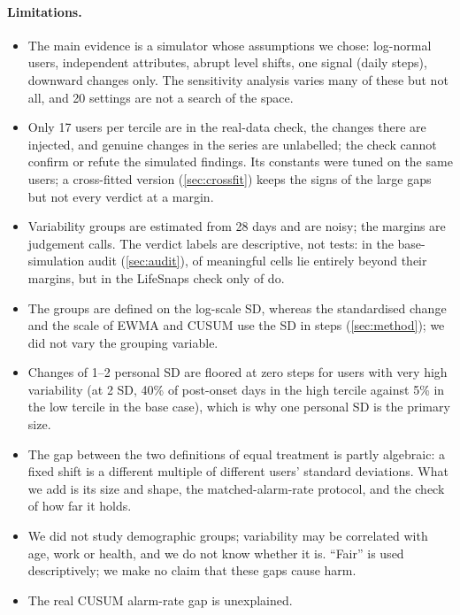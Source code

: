 \documentclass[11pt,a4paper]{article}
\begin{document}
\paragraph{Limitations.}
\begin{itemize}
  \item The main evidence is a simulator whose assumptions we chose: log-normal users, independent attributes, abrupt level shifts, one signal (daily steps), downward changes only. The sensitivity analysis varies many of these but not all, and 20 settings are not a search of the space.
  \item Only 17 users per tercile are in the real-data check, the changes there are injected, and genuine changes in the series are unlabelled; the check cannot confirm or refute the simulated findings. Its constants were tuned on the same users; a cross-fitted version (\cref{sec:crossfit}) keeps the signs of the large gaps but not every verdict at a margin.
  \item Variability groups are estimated from 28 days and are noisy; the margins are judgement calls. The verdict labels are descriptive, not tests: in the base-simulation audit (\cref{sec:audit}), \AuditClear{} of \AuditMeaningful{} meaningful cells lie entirely beyond their margins, but in the LifeSnaps check only \LsClear{} of \LsMeaningful{} do.
  \item The groups are defined on the log-scale SD, whereas the standardised change and the scale of EWMA and CUSUM use the SD in steps (\cref{sec:method}); we did not vary the grouping variable.
  \item Changes of 1--2 personal SD are floored at zero steps for users with very high variability (at 2 SD, 40\% of post-onset days in the high tercile against 5\% in the low tercile in the base case), which is why one personal SD is the primary size.
  \item The gap between the two definitions of equal treatment is partly algebraic: a fixed shift is a different multiple of different users' standard deviations. What we add is its size and shape, the matched-alarm-rate protocol, and the check of how far it holds.
  \item We did not study demographic groups; variability may be correlated with age, work or health, and we do not know whether it is. ``Fair'' is used descriptively; we make no claim that these gaps cause harm.
  \item The real CUSUM alarm-rate gap is unexplained.
\end{itemize}
\end{document}
